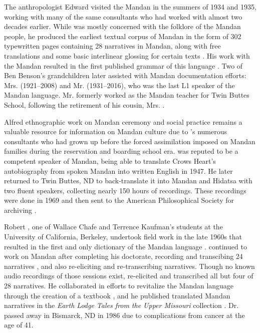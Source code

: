 The anthropologist Edward \citeauthor{kennard1936} visited the Mandan in the summers of 1934 and 1935, working with many of the same consultants who had worked with \citeauthor{densmore1923} almost two decades earlier. While \citeauthor{kennard1936} was mostly concerned with the folklore of the Mandan people, he produced the earliest textual corpus of Mandan in the form of 302 typewritten pages containing 28 narratives in Mandan, along with free translations and some basic interlinear glossing for certain texts \citep{kennard1934}. His work with the Mandan resulted in the first published grammar of this language \citep{kennard1936}. Two of Ben Benson's grandchildren later assisted with Mandan documentation efforts: Mrs.  (1921--2008) and Mr.  (1931--2016), who was the last L1 speaker of the Mandan language. Mr.  formerly worked as the Mandan teacher for Twin Buttes School, following the retirement of his cousin, Mrs. .

Alfred  ethnographic work on Mandan ceremony and social practice remains a valuable resource for information on Mandan culture due to \citeauthor{bowers1950}'s numerous consultants who had grown up before the forced assimilation imposed on Mandan families during the reservation and boarding school era. \citeauthor{bowers1950} was reputed to be a competent speaker of Mandan, being able to translate Crows Heart's autobiography from spoken Mandan into written English in 1947. He later returned to Twin Buttes, ND to back-translate it into Mandan and Hidatsa with two fluent speakers, collecting nearly 150 hours of recordings. These recordings were done in 1969 and then sent to the American Philosophical Society for archiving \citep{bowers1971}.

Robert \citeauthor{hollow1970}, one of Wallace Chafe and Terrence Kaufman's students at the University of California, Berkeley, undertook field work in the late 1960s that resulted in the first and only dictionary of the Mandan language \citep{hollow1970}. \citeauthor{hollow1970} continued to work on Mandan after completing his doctorate, recording and transcibing 24 narratives \citep{hollow1973a}, and also re-eliciting and re-transcribing  narratives. Though no known audio recordings of those sessions exist, \citep{hollow1973b} re-elicited and transcribed all but four of  28 narratives. He collaborated in efforts to revitalize the Mandan language through the creation of a textbook \citep{hollow1976}, and he published translated Mandan narratives in the \textit{Earth Lodge Tales from the Upper Missouri} collection \citep{parksjoneshollow1978}. Dr. \citeauthor{hollow1970} passed away in Bismarck, ND in 1986 due to complications from cancer at the age of 41.

